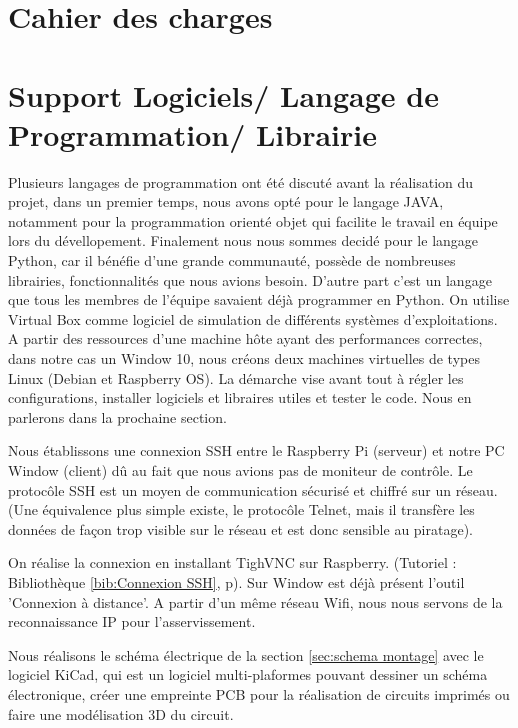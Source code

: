 \documentclass[a4paper]{report}
\begin{document}
        \section{Cahier des charges}
        
        \section{Support Logiciels/ Langage de Programmation/ Librairie}
        
        Plusieurs langages de programmation ont été discuté avant la réalisation du projet, dans un premier temps, nous avons opté pour le langage JAVA, notamment pour la programmation orienté objet qui facilite le travail en équipe lors du dévellopement. Finalement nous nous sommes decidé pour le langage Python, car il bénéfie d'une grande communauté, possède de nombreuses librairies, fonctionnalités que nous avions besoin. D'autre part c'est un langage que tous les membres de l'équipe savaient déjà programmer en Python.
        On utilise Virtual Box comme logiciel de simulation de différents systèmes d'exploitations.
    A partir des ressources d'une machine h\^{o}te ayant des performances correctes, dans notre 
    cas un Window 10, nous créons deux machines virtuelles de types Linux (Debian et Raspberry OS).
    La démarche vise avant tout à régler les configurations, installer logiciels et libraires utiles et 
    tester le code. Nous en parlerons dans la prochaine section.

    Nous établissons une connexion SSH entre le Raspberry Pi (serveur) et notre PC Window (client) dû au fait
    que nous avions pas de moniteur de contr\^{o}le. Le protoc\^{o}le SSH est un moyen 
    de communication sécurisé et chiffré sur un réseau. (Une équivalence plus simple
    existe, le protoc\^{o}le Telnet, mais il transfère les données de façon trop visible
    sur le réseau et est donc sensible au piratage). 

    On réalise la connexion en installant TighVNC sur Raspberry. (Tutoriel : Bibliothèque \ref{bib:Connexion SSH},
    p\pageref{bib:Connexion SSH}). Sur Window est déjà présent l'outil 'Connexion à distance'.
    A partir d'un m\^{e}me réseau Wifi,  nous nous servons de la reconnaissance IP pour l'asservissement.

    Nous réalisons le schéma électrique de la section \ref{sec:schema montage} avec le logiciel KiCad,
    qui est un logiciel multi-plaformes pouvant dessiner un schéma électronique, créer une empreinte
    PCB pour la réalisation de circuits imprimés ou faire une modélisation 3D du circuit.
    
\end{document}
